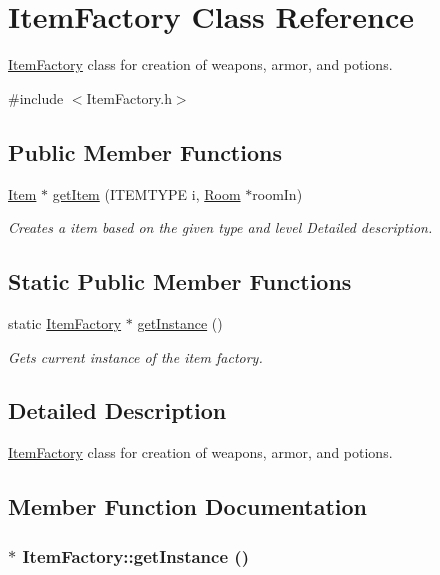 \hypertarget{classItemFactory}{
\section{ItemFactory Class Reference}
\label{classItemFactory}
}


\hyperlink{classItemFactory}{ItemFactory} class for creation of weapons, armor, and potions.  


{\ttfamily \#include $<$ItemFactory.h$>$}\subsection*{Public Member Functions}
\begin{DoxyCompactItemize}
\item 
\hyperlink{classItem}{Item} $\ast$ \hyperlink{classItemFactory_a3309bc85cb53352b065333b0286b55d1}{getItem} (ITEMTYPE i, \hyperlink{classRoom}{Room} $\ast$roomIn)
\begin{DoxyCompactList}\small\item\em Creates a item based on the given type and level Detailed description. \item\end{DoxyCompactList}\end{DoxyCompactItemize}
\subsection*{Static Public Member Functions}
\begin{DoxyCompactItemize}
\item 
static \hyperlink{classItemFactory}{ItemFactory} $\ast$ \hyperlink{classItemFactory_a153ed89281805ef55db14725ea5065a1}{getInstance} ()
\begin{DoxyCompactList}\small\item\em Gets current instance of the item factory. \item\end{DoxyCompactList}\end{DoxyCompactItemize}


\subsection{Detailed Description}
\hyperlink{classItemFactory}{ItemFactory} class for creation of weapons, armor, and potions. 

\subsection{Member Function Documentation}
\hypertarget{classItemFactory_a153ed89281805ef55db14725ea5065a1}{
\subsubsection[{getInstance}]{ $\ast$ ItemFactory::getInstance ()}}
\label{classItemFactory_a153ed89281805ef55db14725ea5065a1}


